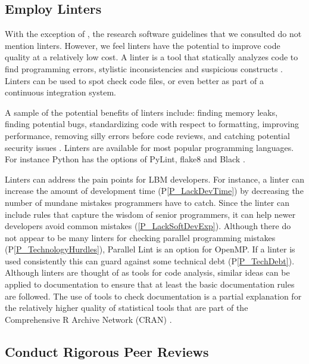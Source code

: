 \documentclass[final, 3p, times, authoryear]{elsarticle}
\newcommand{\ppref}[1]{P\ref{#1}}
\begin{document}
\subsection{Employ Linters} \label{Sec_Linters}

With the exception of \citet{ThielEtAl2020}, the research software guidelines
that we consulted do not mention linters.  However, we feel linters have the
potential to improve code quality at a relatively low cost.  A linter is a tool
that statically analyzes code to find programming errors, stylistic
inconsistencies and suspicious constructs \citep{Wikipedia2022_Lint}. Linters
can be used to spot check code files, or even better as part of a continuous
integration system.  

A sample of the potential benefits of linters include: finding memory leaks,
finding potential bugs, standardizing code with respect to formatting, improving
performance, removing silly errors before code reviews, and catching potential
security issues \citep{SourceLevel2022_Lint}.  Linters are available for most
popular programming languages.  For instance Python has the options of PyLint,
flake8 and Black \citep{Zadka2018}.

Linters can address the pain points for LBM developers.  For instance, a linter
can increase the amount of development time (\ppref{P_LackDevTime}) by
decreasing the number of mundane mistakes programmers have to catch.  Since the
linter can include rules that capture the wisdom of senior programmers, it can
help newer developers avoid common mistakes (\ref{P_LackSoftDevExp}).  Although
there do not appear to be many linters for checking parallel programming
mistakes (\ppref{P_TechnologyHurdles}), Parallel Lint is an option for OpenMP.
If a linter is used consistently this can guard against some technical debt
(\ppref{P_TechDebt}). Although linters are thought of as tools for code
analysis, similar ideas can be applied to documentation to ensure that at least
the basic documentation rules are followed.  The use of tools to check
documentation is a partial explanation for the relatively higher quality of
statistical tools that are part of the Comprehensive R Archive Network (CRAN)
\citep{SmithEtAl2018_StatSoft}.

\subsection{Conduct Rigorous Peer Reviews}
\end{document}
